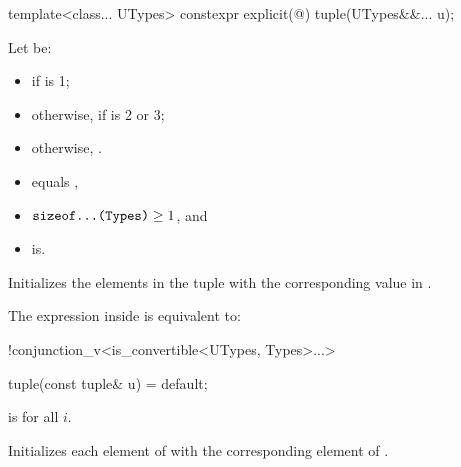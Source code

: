 \documentclass{wg21}
\begin{document}
%
\begin{itemdecl}
    template<class... UTypes> constexpr explicit(@\seebelow@) tuple(UTypes&&... u);
\end{itemdecl}

\begin{itemdescr}
    \pnum
    Let  be:
    \begin{itemize}
        \item
        if  is 1;
        \item
        otherwise,
        if  is 2 or 3;
        \item
        otherwise, .
    \end{itemize}

    \pnum
    \constraints
    \begin{itemize}
        \item
         equals ,
        \item
        $\texttt{sizeof...(Types)} \geq 1$, and
        \item
         is\newline {}.
    \end{itemize}

    \pnum
    \effects
    Initializes the elements in the tuple with the
    corresponding value in .

    \pnum
    \remarks
    The expression inside  is equivalent to:
    \begin{codeblock}
        !conjunction_v<is_convertible<UTypes, Types>...>
    \end{codeblock}
\end{itemdescr}

%
\begin{itemdecl}
    tuple(const tuple& u) = default;
\end{itemdecl}

\begin{itemdescr}
    \pnum
    \mandates
     is  for all $i$.

    \pnum
    \effects
    Initializes each element of  with the
    corresponding element of .
\end{itemdescr}
\end{document}
